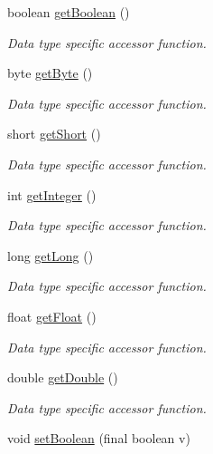 \begin{DoxyCompactItemize}
boolean \mbox{\hyperlink{classorg_1_1libelektra_1_1Key_a9841edcf6c48799c77d8db3b82189abc}{get\+Boolean}} ()
\begin{DoxyCompactList}\small\item\em Data type specific accessor function. \end{DoxyCompactList}\item 
byte \mbox{\hyperlink{classorg_1_1libelektra_1_1Key_ad29faef52eb7ceb2940d4960a5717b5c}{get\+Byte}} ()
\begin{DoxyCompactList}\small\item\em Data type specific accessor function. \end{DoxyCompactList}\item 
short \mbox{\hyperlink{classorg_1_1libelektra_1_1Key_a51754727fad0f4f9a540226ec329c74b}{get\+Short}} ()
\begin{DoxyCompactList}\small\item\em Data type specific accessor function. \end{DoxyCompactList}\item 
int \mbox{\hyperlink{classorg_1_1libelektra_1_1Key_a1dfefbb75e54fd1bff57d626954fb4fc}{get\+Integer}} ()
\begin{DoxyCompactList}\small\item\em Data type specific accessor function. \end{DoxyCompactList}\item 
long \mbox{\hyperlink{classorg_1_1libelektra_1_1Key_a545c7042ebb95d4b8ad45658ebb8ec85}{get\+Long}} ()
\begin{DoxyCompactList}\small\item\em Data type specific accessor function. \end{DoxyCompactList}\item 
float \mbox{\hyperlink{classorg_1_1libelektra_1_1Key_a24351f3c1faf4f7d69c7761aa60e69f1}{get\+Float}} ()
\begin{DoxyCompactList}\small\item\em Data type specific accessor function. \end{DoxyCompactList}\item 
double \mbox{\hyperlink{classorg_1_1libelektra_1_1Key_a64f1c2bc6776b8f08d8e50554713d07a}{get\+Double}} ()
\begin{DoxyCompactList}\small\item\em Data type specific accessor function. \end{DoxyCompactList}\item 
void \mbox{\hyperlink{classorg_1_1libelektra_1_1Key_a005125c24abc41a799d73d09c8c148f1}{set\+Boolean}} (final boolean v)

\end{DoxyCompactItemize}
